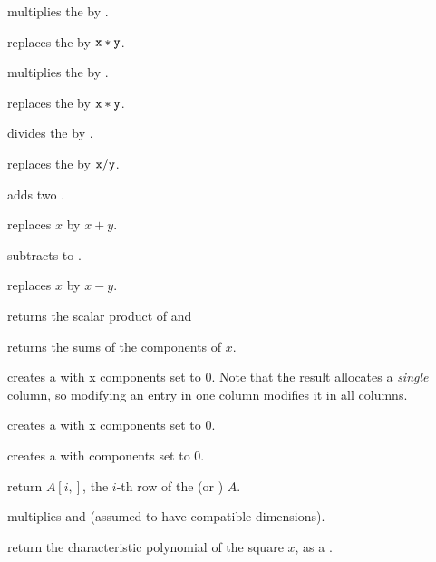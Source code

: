  multiplies the 
 by .

 replaces
the   by ${\tt x}*{\tt y}$.

 multiplies the 
 by .

 replaces
the   by ${\tt x}*{\tt y}$.

 divides the 
 by .

 replaces
the   by ${\tt x}/{\tt y}$.

 adds two .

 replaces
$x$ by $x+y$.

 subtracts  to .

 replaces
$x$ by $x-y$.

 returns the scalar product
of  and 

 returns the sums of the components of $x$.

 creates a  with  x 
components set to $0$. Note that the result allocates a
\emph{single} column, so modifying an entry in one column modifies it in
all columns.

 creates a  with  x
 components set to $0$.

 creates a  with  components set to
$0$.

 return $A[i,]$, the $i$-th row of the
 (or ) $A$.

 multiplies   and 
(assumed to have compatible dimensions).

 return the characteristic polynomial of
the square  $x$, as a .


